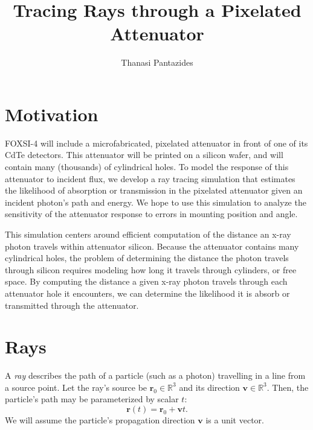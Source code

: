 \documentclass[10pt,letterpaper]{article}
\author{Thanasi Pantazides}
\title{Tracing Rays through a Pixelated Attenuator}
\begin{document}
\newcommand{\mbs}[1]{\ensuremath{\boldsymbol{#1}}}
\newcommand{\trans}{\ensuremath{\mathsf{T}}}
\newcommand{\norm}[1]{\left\Vert#1\right\Vert} 	

\newcommand{\source}{\ensuremath{\mbs{r}_0}}
\newcommand{\path}{\ensuremath{\mbs{v}}}

\newcommand{\radius}{\ensuremath{R}}
\newcommand{\height}{\ensuremath{h}}
\newcommand{\cent}{\ensuremath{\mbs{c}}}
\newcommand{\axis}{\ensuremath{\mbs{a}}}

\newcommand{\headtime}{\ensuremath{t_c}}
\newcommand{\walltime}{\ensuremath{t_w}}

\newcommand{\foxsi}{FOXSI-4}


\maketitle

\section{Motivation}
\foxsi{} will include a microfabricated, pixelated attenuator in front of one of its CdTe detectors. This attenuator will be printed on a silicon wafer, and will contain many (thousands) of cylindrical holes. To model the response of this attenuator to incident flux, we develop a ray tracing simulation that estimates the likelihood of absorption or transmission in the pixelated attenuator given an incident photon's path and energy. We hope to use this simulation to analyze the sensitivity of the attenuator response to errors in mounting position and angle. 

This simulation centers around efficient computation of the distance an x-ray photon travels within attenuator silicon. Because the attenuator contains many cylindrical holes, the problem of determining the distance the photon travels through silicon requires modeling how long it travels through cylinders, or free space. By computing the distance a given x-ray photon travels through each attenuator hole it encounters, we can determine the likelihood it is absorb or transmitted through the attenuator.

\section{Rays}
A \textit{ray} describes the path of a particle (such as a photon) travelling in a line from a source point. Let the ray's source be $\source \in \mathbb{R}^3$ and its direction $\path \in \mathbb{R}^3$. Then, the particle's path may be parameterized by scalar $t$:
	\begin{equation}
		\mbs{r}(t) = \source + \path t .
		\label{eqn:trajectory}
	\end{equation} 
We will assume the particle's propagation direction $\path$ is a unit vector.
\end{document}
